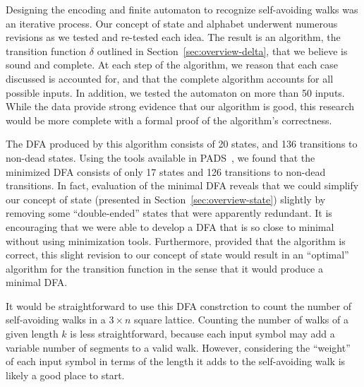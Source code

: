 Designing the encoding and finite automaton to recognize self-avoiding walks was an iterative process. Our concept of state and alphabet underwent numerous revisions as we tested and re-tested each idea. The result is an algorithm, the transition function $\delta$ outlined in Section~\ref{sec:overview-delta}, that we believe is sound and complete. At each step of the algorithm, we reason that each case discussed is accounted for, and that the complete algorithm accounts for all possible inputs. In addition, we tested the automaton on more than 50 inputs. While the data provide strong evidence that our algorithm is good, this research would be more complete with a formal proof of the algorithm's correctness.

The DFA produced by this algorithm consists of 20 states, and 136 transitions to non-dead states. Using the tools available in PADS~\cite{eppstein:automata:www:2013}, we found that the minimized DFA consists of only 17 states and 126 transitions to non-dead transitions. In fact, evaluation of the minimal DFA reveals that we could simplify our concept of state (presented in Section~\ref{sec:overview-state}) slightly by removing some ``double-ended'' states that were apparently redundant. It is encouraging that we were able to develop a DFA that is so close to minimal without using minimization tools. Furthermore, provided that the algorithm is correct, this slight revision to our concept of state would result in an ``optimal'' algorithm for the transition function in the sense that it would produce a minimal DFA. 

It would be straightforward to use this DFA constrction to count the number of self-avoiding walks in a $3\times n$ square lattice. Counting the number of walks of a given length $k$ is less straightforward, because each input symbol may add a variable number of segments to a valid walk. However, considering the ``weight'' of each input symbol in terms of the length it adds to the self-avoiding walk is likely a good place to start.
